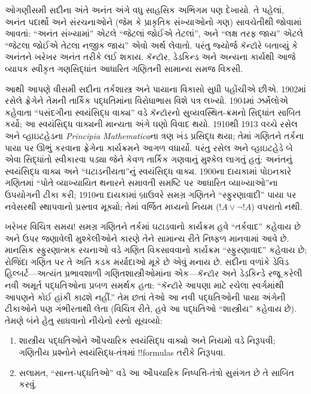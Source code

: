 \documentclass[../../../include/open-logic-section]{subfiles}
\begin{document}
ઓગણીસમી સદીના અંતે અનંત અંગે વધુ સાહસિક અભિગમ પણ
દેખાયો. તે પહેલાં, અનંત પદાર્થો અને સંરચનાઓને
(જેમ કે પ્રાકૃતિક સંખ્યાઓનો ગણ) સાવચેતીથી જોવામાં
આવતાં: ``અનંત સંખ્યામાં'' એટલે ``જેટલાં જોઈએ તેટલાં'',
અને ``લક્ષ તરફ જાય'' એટલે ``જેટલા જોઈએ તેટલા નજીક
જાય'' એવો અર્થ લેવાતો. પરંતુ જ્યોર્જ કૅન્ટૉરે બતાવ્યું
કે અનંતને ખરેખર અનંત તરીકે લઈ શકાય. કૅન્ટૉર,
ડેડકિન્ડ અને અન્યના કાર્યથી આજે વ્યાપક સ્વીકૃત
ગણસિદ્ધાંત આધારિત ગણિતની સામાન્ય સમજ વિકસી.

આથી આપણે વીસમી સદીના તર્કશાસ્ત્ર અને પાયાના વિકાસો
સુધી પહોંચીએ છીએ. 1902માં રસેલે ફ્રેગેને તેમની તાર્કિક
પદ્ધતિમાંના વિરોધાભાસ વિશે પત્ર લખ્યો.
1904માં ઝર્મેલોએ
કહેવાતા ``પસંદગીના સ્વયંસિદ્ધ વાક્ય'' વડે કૅન્ટૉરનો
સુવ્યવસ્થિત-ક્રમનો સિદ્ધાંત સાબિત કર્યો; આ સ્વયંસિદ્ધ
વાક્યની માન્યતા અંગે ઘણો વિવાદ થયો. 1910થી 1913
વચ્ચે રસેલ અને વ્હાઇટહેડના \emph{Principia Mathematica}ના
ત્રણ ખંડ પ્રસિદ્ધ થયા; તેમાં ગણિતને તર્કના પાયા પર
ઊભું કરવાના ફ્રેગેના કાર્યક્રમને આગળ વધાર્યો. પરંતુ
રસેલ અને વ્હાઇટહેડે બે એવા સિદ્ધાંતો સ્વીકારવા પડ્યા
જેને કેવળ તાર્કિક ગણવાનું મુશ્કેલ લાગતું હતું:
અનંતનું સ્વયંસિદ્ધ વાક્ય અને ``ઘટાડનીયતા''નું
સ્વયંસિદ્ધ વાક્ય. 1900ના દાયકામાં પોઇનકારે ગણિતમાં
``પોતે વ્યાખ્યાયિત થનારને સમાવતી સમષ્ટિ પર આધારિત
વ્યાખ્યાઓ''ના ઉપયોગની ટીકા કરી;
1910ના દાયકામાં બ્રાઉવરે સમગ્ર ગણિતને ``સ્ફુરણાવાદી''
પાયા પર નવેસરથી સ્થાપવાનો પ્રસ્તાવ મૂક્યો; તેમાં
વર્જિત મધ્યનો નિયમ ($!A \lor \lnot !A$) વપરાતો નથી.

ખરેખર વિચિત્ર સમય!{} સમગ્ર ગણિતને તર્કમાં ઘટાડવાનો
કાર્યક્રમ હવે ``તર્કવાદ'' કહેવાય છે અને ઉપર જણાવેલી
મુશ્કેલીઓને કારણે તેને સામાન્ય રીતે નિષ્ફળ માનવામાં
આવે છે. માનસિક સ્ફુરણાત્મક રચનાઓ વડે ગણિત વિકસાવવાનો
કાર્યક્રમ ``સ્ફુરણાવાદ'' કહેવાય છે; રોજિંદા ગણિત પર
તે અતિ કડક મર્યાદાઓ મૂકે છે એવું મનાય છે. સદીના
વળાંકે ડેવિડ હિલ્બર્ટ—અત્યંત પ્રભાવશાળી ગણિતશાસ્ત્રીઓમાંના
એક—કૅન્ટૉર અને ડેડકિન્ડે રજૂ કરેલી નવી અમૂર્ત
પદ્ધતિઓના પ્રબળ સમર્થક હતા: ``કૅન્ટૉરે આપણા માટે
રચેલા સ્વર્ગમાંથી આપણને કોઈ હાંકી કાઢશે નહીં.''
તેમ છતાં તેઓ આ નવી પદ્ધતિઓની પાયા અંગેની ટીકાઓને
પણ ગંભીરતાથી લેતા (વિચિત્ર રીતે, હવે આ પદ્ધતિઓ
``શાસ્ત્રીય'' કહેવાય છે). તેમણે બંને હેતુ સાધવાનો
નીચેનો રસ્તો સૂચવ્યો:
\begin{enumerate}
\item શાસ્ત્રીય પદ્ધતિઓને ઔપચારિક સ્વયંસિદ્ધ વાક્યો અને
  નિયમો વડે નિરૂપવી; ગણિતીય પ્રશ્નોને સ્વયંસિદ્ધ-તંત્રમાં
  !!{formula}s તરીકે નિરૂપવા.
\item સલામત, ``સાન્ત-પદ્ધતિઓ'' વડે આ ઔપચારિક
  નિષ્પત્તિ-તંત્રો સુસંગત છે તે સાબિત કરવું.
\end{enumerate}
\end{document}
